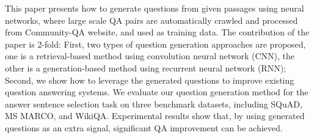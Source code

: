 This paper presents how to generate questions from given passages using neural networks, where large scale QA pairs are automatically crawled and processed from Community-QA website, and used as training data. The contribution of the paper is 2-fold: First, two types of question generation approaches are proposed, one is a retrieval-based method using convolution neural network (CNN), the other is a generation-based method using recurrent neural network (RNN); Second, we show how to leverage the generated questions to improve existing question answering systems. We evaluate our question generation method for the answer sentence selection task on three benchmark datasets, including SQuAD, MS MARCO, and WikiQA. Experimental results show that, by using generated questions as an extra signal, significant QA improvement can be achieved.
